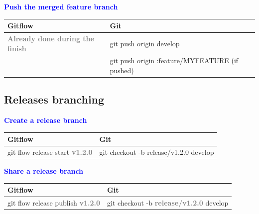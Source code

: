 \documentclass{tufte-handout}
\begin{document}
		
		\textbf{\textcolor{blue}{Push the merged feature branch}}
		
		\begin{table}[ht]
			\centering
			\selectfont
			\begin{tabular}{ll}
				Gitflow & Git \\
				\midrule
				\textbf{\textcolor{gray}{Already done during the finish}} & git push origin develop \\
				& git push origin :feature/MYFEATURE (if pushed) \\
			\end{tabular}
			\label{tab:normaltab}
		\end{table}
		\medskip %
		
		\clearpage
		
		\subsection{Releases branching}
		
		\hspace{1em}\textbf{\textcolor{blue}{Create a release branch}}
		
		\begin{table}[ht]
			\centering
			\selectfont
			\begin{tabular}{ll}
				Gitflow & Git \\
				\midrule
				git flow release start \textbf{\textcolor{gray}{v1.2.0}} & git checkout -b release/v1.2.0 develop \\
			\end{tabular}
			\label{tab:normaltab}
		\end{table}
		\medskip %
		

		\textbf{\textcolor{blue}{Share a release branch}}
		
		\begin{table}[ht]
			\centering
			\selectfont
			\begin{tabular}{ll}
				Gitflow & Git \\
				\midrule
				git flow release publish \textbf{\textcolor{gray}{v1.2.0}} & git checkout -b
				\textbf{\textcolor{gray}{release/v1.2.0}} develop \\
			\end{tabular}
			\label{tab:normaltab}
		\end{table}
		\medskip %
\end{document}
